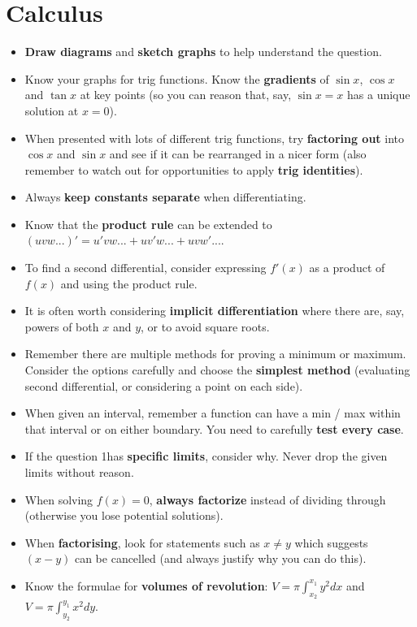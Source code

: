 \documentclass[9pt]{extarticle}
\begin{document}
	\section{Calculus}
	
	\begin{itemize}
		\item \textbf{Draw diagrams} and \textbf{sketch graphs} to help understand the question.
		\item Know your graphs for trig functions. Know the \textbf{gradients} of $\sin x$, $\cos x$ and $\tan x$ at key points (so you can reason that, say, $\sin x = x$ has a unique solution at $x=0$).
		\item When presented with lots of different trig functions, try \textbf{factoring out} into $\cos x$ and $\sin x$ and see if it can be rearranged in a nicer form (also remember to watch out for opportunities to apply \textbf{trig identities}).
		\item Always \textbf{keep constants separate} when differentiating.
		\item Know that the \textbf{product rule} can be extended to $(uvw...)' = u'vw...+ uv'w... + uvw'...$.
		\item To find a second differential, consider expressing $f'(x)$ as a product of $f(x)$ and using the product rule.
		\item It is often worth considering \textbf{implicit differentiation} where there are, say, powers of both $x$ and $y$, or to avoid square roots.
		\item Remember there are multiple methods for proving a minimum or maximum. Consider the options carefully and choose the \textbf{simplest method} (evaluating second differential, or considering a point on each side).
		\item When given an interval, remember a function can have a min / max within that interval or on either boundary. You need to carefully \textbf{test every case}.
		\item If the question 1has \textbf{specific limits}, consider why. Never drop the given limits without reason.
		\item When solving $f(x)=0$, \textbf{always factorize} instead of dividing through (otherwise you lose potential solutions).
		\item When \textbf{factorising}, look for statements such as $x \not= y$ which suggests $(x-y)$ can be cancelled (and always justify why you can do this).
		\item Know the formulae for \textbf{volumes of revolution}: $V = \pi \int_{x_2}^{x_1} y^2 dx$ and $V = \pi \int_{y_2}^{y_1} x^2 dy$.
	\end{itemize}
	
\end{document}
